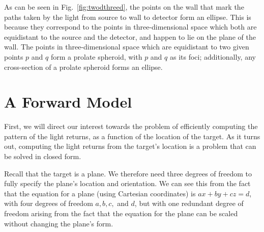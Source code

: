 \documentclass[11pt]{article}
\begin{document}
As can be seen in Fig.~\ref{fig:twodthreed}, the points on the wall that mark the paths taken by the light from source to wall to detector form an ellipse. This is because they correspond to the points in three-dimensional space which both are equidistant to the source and the detector, and happen to lie on the plane of the wall. The points in three-dimensional space which are equidistant to two given points $p$ and $q$ form a prolate spheroid\footnotemark, with $p$ and $q$ as its foci; additionally, any cross-section of a prolate spheroid forms an ellipse.


\section{A Forward Model}

First, we will direct our interest towards the problem of efficiently computing the pattern of the light returns, as a function of the location of the target. As it turns out, computing the light returns from the target's location is a problem that can be solved in closed form.

Recall that the target is a plane. We therefore need three degrees of freedom to fully specify the plane's location and orientation. We can see this from the fact that the equation for a plane (using Cartesian coordinates) is $ax + by + cz = d$, with four degrees of freedom $a, b, c,$ and $d$, but with one redundant degree of freedom arising from the fact that the equation for the plane can be scaled without changing the plane's form. 
\end{document}
